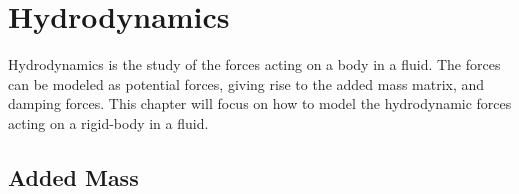 \section{Hydrodynamics}
\label{sec:hydrodynamics}

Hydrodynamics is the study of the forces acting on a body in a fluid. The forces
can be modeled as potential forces, giving rise to the added mass matrix, and
damping forces. This chapter will focus on how to model the hydrodynamic forces
acting on a rigid-body in a fluid.

\subsection{Added Mass}

